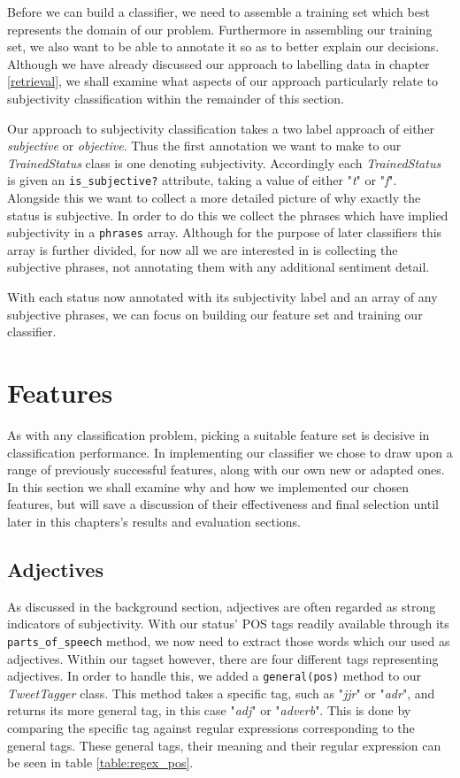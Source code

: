 Before we can build a classifier, we need to assemble a training set which best represents the domain of our problem. Furthermore in assembling our training set, we also want to be able to annotate it so as to better explain our decisions. Although we have already discussed our approach to labelling data in chapter \ref{retrieval}, we shall examine what aspects of our approach particularly relate to subjectivity classification within the remainder of this section.

Our approach to subjectivity classification takes a two label approach of either \emph{subjective} or \emph{objective}. Thus the first annotation we want to make to our \emph{TrainedStatus} class is one denoting subjectivity. Accordingly each \emph{TrainedStatus} is given an \texttt{is\_subjective?} attribute, taking a value of either "\emph{t}" or "\emph{f}". Alongside this we want to collect a more detailed picture of why exactly the status is subjective. In order to do this we collect the phrases which have implied subjectivity in a \texttt{phrases} array. Although for the purpose of later classifiers this array is further divided, for now all we are interested in is collecting the subjective phrases, not annotating them with any additional sentiment detail.

With each status now annotated with its subjectivity label and an array of any subjective phrases, we can focus on building our feature set and training our classifier.

\section{Features}

As with any classification problem, picking a suitable feature set is decisive in classification performance. In implementing our classifier we chose to draw upon a range of previously successful features, along with our own new or adapted ones. In this section we shall examine why and how we implemented our chosen features, but will save a discussion of their effectiveness and final selection until later in this chapters's results and evaluation sections.

\subsection{Adjectives}

As discussed in the background section, adjectives are often regarded as strong indicators of subjectivity. With our status' POS tags readily available through its \texttt{parts\_of\_speech} method, we now need to extract those words which our used as adjectives. Within our tagset however, there are four different tags representing adjectives. In order to handle this, we added a \texttt{general(pos)} method to our \emph{TweetTagger} class. This method takes a specific tag, such as "\emph{jjr}" or "\emph{adr}", and returns its more general tag, in this case "\emph{adj}" or "\emph{adverb}". This is done by comparing the specific tag against regular expressions corresponding to the general tags. These general tags, their meaning and their regular expression can be seen in table \ref{table:regex_pos}.

